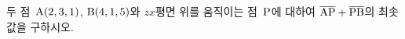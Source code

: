 두 점~$\mathrm{A}(2{,}\mkern3mu\mathopen{}3{,}\mkern3mu\mathopen{}1)$, $\mathrm{B}(4{,}\mkern3mu\mathopen{}1{,}\mkern3mu\mathopen{}5)$와 $zx$평면 위를 움직이는 점~$\mathrm{P}$에 대하여 $\overline{\mathrm{AP}}+\overline{\mathrm{PB}}$의 최솟값을 구하시오.
